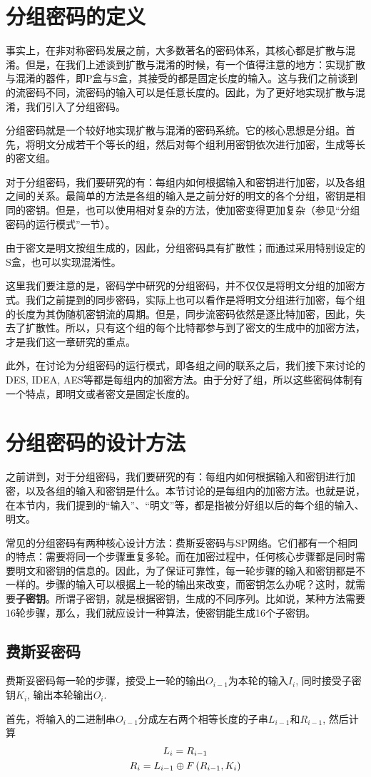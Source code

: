\section{分组密码的定义}
事实上，在非对称密码发展之前，大多数著名的密码体系，其核心都是扩散与混淆。但是，在我们上述谈到扩散与混淆的时候，有一个值得注意的地方：实现扩散与混淆的器件，即P盒与S盒，其接受的都是固定长度的输入。这与我们之前谈到的流密码不同，流密码的输入可以是任意长度的。因此，为了更好地实现扩散与混淆，我们引入了分组密码。\par
分组密码就是一个较好地实现扩散与混淆的密码系统。它的核心思想是分组。首先，将明文分成若干个等长的组，然后对每个组利用密钥依次进行加密，生成等长的密文组。\par
对于分组密码，我们要研究的有：每组内如何根据输入和密钥进行加密，以及各组之间的关系。最简单的方法是各组的输入是之前分好的明文的各个分组，密钥是相同的密钥。但是，也可以使用相对复杂的方法，使加密变得更加复杂（参见“分组密码的运行模式”一节）。\par
由于密文是明文按组生成的，因此，分组密码具有扩散性；而通过采用特别设定的S盒，也可以实现混淆性。\par
这里我们要注意的是，密码学中研究的分组密码，并不仅仅是将明文分组的加密方式。我们之前提到的同步密码，实际上也可以看作是将明文分组进行加密，每个组的长度为其伪随机密钥流的周期。但是，同步流密码依然是逐比特加密，因此，失去了扩散性。所以，只有这个组的每个比特都参与到了密文的生成中的加密方法，才是我们这一章研究的重点。\par
此外，在讨论为分组密码的运行模式，即各组之间的联系之后，我们接下来讨论的DES, IDEA, AES等都是每组内的加密方法。由于分好了组，所以这些密码体制有一个特点，即明文或者密文是固定长度的。
\section{分组密码的设计方法}
之前讲到，对于分组密码，我们要研究的有：每组内如何根据输入和密钥进行加密，以及各组的输入和密钥是什么。本节讨论的是每组内的加密方法。也就是说，在本节内，我们提到的“输入”、“明文”等，都是指被分好组以后的每个组的输入、明文。\par
常见的分组密码有两种核心设计方法：费斯妥密码与SP网络。它们都有一个相同的特点：需要将同一个步骤重复多轮。而在加密过程中，任何核心步骤都是同时需要明文和密钥的信息的。因此，为了保证可靠性，每一轮步骤的输入和密钥都是不一样的。步骤的输入可以根据上一轮的输出来改变，而密钥怎么办呢？这时，就需要\textbf{子密钥}。所谓子密钥，就是根据密钥，生成的不同序列。比如说，某种方法需要16轮步骤，那么，我们就应设计一种算法，使密钥能生成16个子密钥。
\subsection{费斯妥密码}
费斯妥密码每一轮的步骤，接受上一轮的输出$O_{i-1}$为本轮的输入$I_i$, 同时接受子密钥$K_i$, 输出本轮输出$O_i$.\par
首先，将输入的二进制串$O_{i-1}$分成左右两个相等长度的子串$L_{i-1}$和$R_{i-1}$, 然后计算
\begin{gather}
    L_{i}=R_{i-1}\\
    R_{i}=L_{i-1}\oplus F\left( {R_{i-1}, K_i}\right)
\end{gather}

